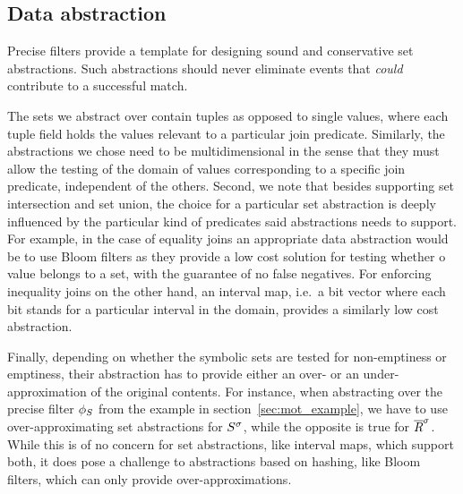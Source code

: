 \subsection{Data abstraction}
\label{sec:data_abstraction}


Precise filters provide a template for designing 
sound and conservative set abstractions.
Such abstractions should never eliminate events that \emph{could}
contribute to a successful match.


The sets we abstract over contain tuples as 
opposed to single values, where each tuple field holds the values relevant to a 
particular join predicate. 
Similarly, the abstractions we chose need to be multidimensional in the sense 
that they must allow the testing of the domain of values corresponding to a 
specific join predicate, independent of the others.  
Second, we note that besides supporting set intersection and set union, the 
choice for a particular set abstraction is deeply influenced by the particular 
kind of predicates said abstractions needs to support.
For example, in the case of equality joins an appropriate data abstraction 
would be to use Bloom filters as they provide a low cost solution for testing 
whether o value belongs to a set, with the guarantee of no false negatives.
For enforcing inequality joins on the other hand, an interval map, i.e.\ a 
bit vector where each bit stands for a particular interval in the domain,
provides a similarly low cost abstraction.  

Finally, depending on whether the symbolic sets are tested for non-emptiness or 
emptiness, their abstraction has to provide either an over- or an 
under-approximation of the original contents.
For instance, when abstracting over the precise filter $\phi_{S}$ from the 
example in section~\ref{sec:mot_example}, we have to use over-approximating set 
abstractions for ${S}^{\sigma}$, while the opposite is true for ${\overline{R}}^{\sigma}$.
While this is of no concern for set abstractions, like interval maps, which 
support both, it does pose a challenge to abstractions based on hashing, like 
Bloom filters, which can only provide over-approximations.



